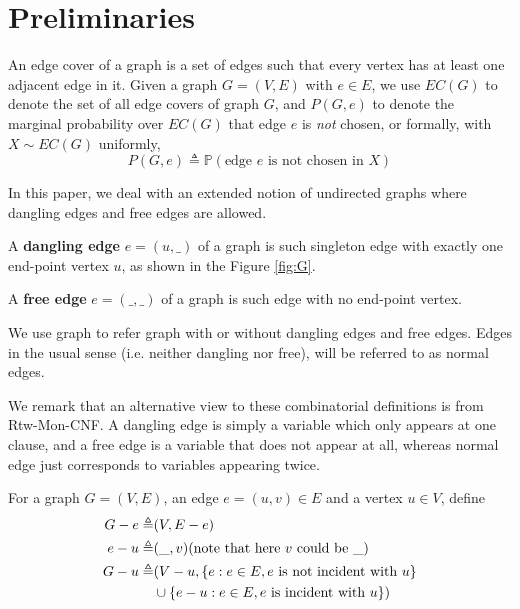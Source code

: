 \section{Preliminaries}
An edge cover of a graph is a set of edges such that every vertex has at least one adjacent edge in it.
Given a graph $G=(V,E)$ with $e \in E$,  we use $EC(G)$ to denote the set of all edge covers of graph $G$, and $P(G, e)$ to denote the marginal probability over $EC(G)$ that edge $e$ is \emph{not} chosen, or formally, with $X \sim EC(G)$ uniformly,
\begin{equation}
	P(G, e) \triangleq \mathbb{P} \left(\textrm{edge $e$ is not chosen in $X$} \right)
	\label{defpge}
\end{equation}

In this paper, we deal with an extended notion of undirected graphs where dangling edges and free edges are allowed.
\begin{Definition}
	A {\bf dangling edge} $e=(u,\_)$ of a graph is such singleton edge with exactly one end-point vertex $u$, as shown in the Figure \ref{fig:G}.

	A {\bf free edge} $e=(\_, \_)$ of a graph is such edge with no end-point vertex. %


\end{Definition}

	We use graph to refer graph with or without dangling edges and free edges.
	Edges in the usual sense (i.e. neither dangling nor free), will be referred to as normal edges.

	We remark that an alternative view to these combinatorial definitions is from Rtw-Mon-CNF.
	A dangling edge is simply a variable which only appears at one clause, and a free edge is a variable
	that does not appear at all, whereas normal edge just corresponds to variables appearing twice.

For a graph $G=(V,E)$, an edge $e = (u,v) \in E$ and a vertex $u \in V$, define
\begin{align*}
    G - e \triangleq& (V, E-e) \\
    e - u \triangleq& (\_, v) \text{(note that here $v$ could be $\_$)} \\
    G - u \triangleq& (V - u, \left\{e: e \in E, e\text{ is not incident with }u\right\} \\
                    &\cup \left\{e - u: e \in E, e\text{ is incident with }u\right\})
\end{align*}

